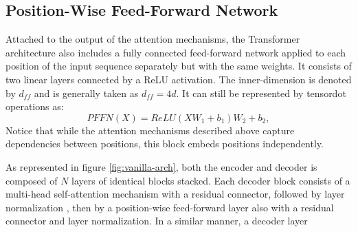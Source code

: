 \subsection{Position-Wise Feed-Forward Network}

Attached to the output of the attention mechanisms, the Transformer architecture also includes a fully connected feed-forward network applied to each position of the input sequence separately but with the same weights. It consists of two linear layers connected by a ReLU activation. The inner-dimension is denoted by $d_{ff}$ and is generally taken as $d_{ff} = 4d$. It can still be represented by tensordot operations as:
$$
PFFN(X) = ReLU(XW_1 + b_1)W_2 + b_2,
$$ 
Notice that while the attention mechanisms described above capture dependencies between positions, this block embeds positions independently.

\vspace{2em}

As represented in figure \ref{fig:vanilla-arch}, both the encoder and decoder is composed of $N$ layers of identical blocks stacked. Each decoder block consists of a multi-head self-attention mechanism with a residual connector, followed by layer normalization \cite{ba2016layer}, then by a position-wise feed-forward layer also with a residual connector and layer normalization. In a similar manner, a decoder layer 
